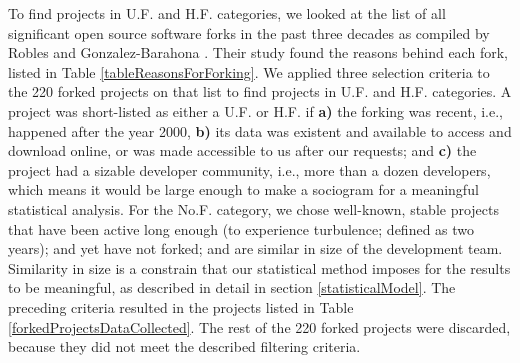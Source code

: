 \documentclass[11pt]{report}
\begin{document}
To find projects in U.F. and H.F. categories, we looked at the list of all significant open source software forks in the past three decades as compiled by Robles and Gonzalez-Barahona \cite{Robles}. Their study found the reasons behind each fork, listed in Table \ref{tableReasonsForForking}. We applied three selection criteria to the 220 forked projects on that list to find projects in U.F. and H.F. categories. A project was short-listed as either a U.F. or H.F. if \textbf{a)} the forking was recent, i.e., happened after the year 2000, \textbf{b)} its data was existent and available to access and download online, or was made accessible to us after our requests; and \textbf{c)} the project had a sizable developer community, i.e., more than a dozen developers, which means it would be large enough to make a sociogram for a meaningful statistical analysis. For the No.F. category, we chose well-known, stable projects that have been active long enough (to experience turbulence; defined as two years); and yet have not forked; and are similar in size of the development team. Similarity in size is a constrain that our statistical method imposes for the results to be meaningful, as described in detail in section \ref{statisticalModel}.  The preceding criteria resulted in the projects listed in Table \ref{forkedProjectsDataCollected}. The rest of the 220 forked projects were discarded, because they did not meet the described filtering criteria.
\end{document}

